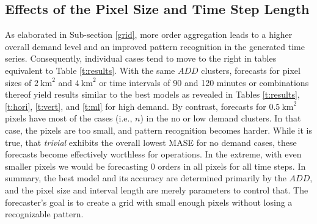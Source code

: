 \subsection{Effects of the Pixel Size and Time Step Length}
\label{pixels_intervals}

As elaborated in Sub-section \ref{grid}, more order aggregation leads to a
    higher overall demand level and an improved pattern recognition in the
    generated time series.
Consequently, individual cases tend to move to the right in tables equivalent
    to Table \ref{t:results}.
With the same $ADD$ clusters, forecasts for pixel sizes of $2~\text{km}^2$ and
    $4~\text{km}^2$ or time intervals of 90 and 120 minutes or combinations
    thereof yield results similar to the best models as revealed in Tables
    \ref{t:results}, \ref{t:hori}, \ref{t:vert}, and \ref{t:ml} for high
    demand.
By contrast, forecasts for $0.5~\text{km}^2$ pixels have most of the cases
    (i.e., $n$) in the no or low demand clusters.
In that case, the pixels are too small, and pattern recognition becomes
    harder.
While it is true, that \textit{trivial} exhibits the overall lowest MASE
    for no demand cases, these forecasts become effectively worthless for
    operations.
In the extreme, with even smaller pixels we would be forecasting $0$ orders
    in all pixels for all time steps.
In summary, the best model and its accuracy are determined primarily by the
    $ADD$, and the pixel size and interval length are merely parameters to
    control that.
The forecaster's goal is to create a grid with small enough pixels without
    losing a recognizable pattern.
